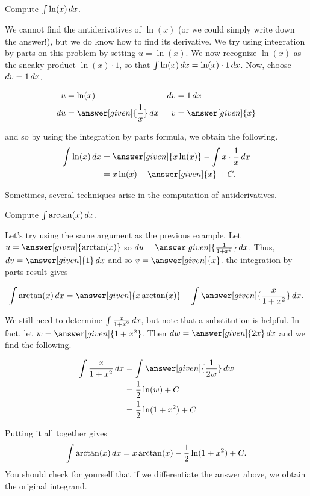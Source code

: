 \documentclass[noauthor]{ximera}
\begin{document}
\begin{example}
Compute $\int \ln(x)\mathop{}\!d x$.

\begin{explanation}
We cannot find the antiderivatives of $\ln(x)$ (or we could simply write down the answer!), but we do know how to find its derivative.  We try using integration by parts on this problem by setting $u=\ln(x)$.  We now recognize $\ln(x)$ as the sneaky product $\ln(x) \cdot 1$, so that $\int \ln(x) \mathop{}\!d x = \ln(x) \cdot 1 \mathop{}\!d x$.  Now, choose $\mathop{}\!d v = 1 \mathop{}\!d x$.  

\begin{align*}
u &= \ln(x) & \d v & =1 \d x \\
 \d u &= \answer[given]{\frac{1}{x}} \d x & v&= \answer[given]{x}
\end{align*}

and so by using the integration by parts formula, we obtain the following.
\begin{align*}
 \int \ln(x)\d x&=\answer[given]{x \ln(x)}-\int x \cdot \frac{1}{x}\d x\\
&= x\ln (x)- \answer[given]{x}+C.\\
\end{align*}
\end{explanation}
\end{example}

Sometimes, several techniques arise in the computation of antiderivatives.

\begin{example}
Compute $\int \arctan(x) \mathop{}\!d x$.

\begin{explanation}
Let's try using the same argument as the previous example.  Let $u=\answer[given]{\arctan (x)}$ so $\d u=\answer[given]{\frac{1}{1+x^{2}} } \d x$. Thus, $\d v=\answer[given]{1} \d x$ and so $v=\answer[given]{x}$.  the integration by parts result gives 


\[
\int \arctan(x) \d x= \answer[given]{x\arctan(x)}- \int \answer[given]{\frac{x}{1+x^2}} \d x.
\]

We still need to determine $\int \frac{x}{1+x^{2}} \mathop{}\!d x$, but note that a substitution is helpful.  In fact, let $w=\answer[given]{1+x^2}$. Then $\d w=\answer[given]{2 x} \d x$ and we find the following.

\begin{align*}
\int \frac{x}{1+x^{2}} \d x &= \int \answer[given]{\frac{1}{2 w}} \d w \\
&= \frac{1}{2} \ln(w) + C\\
&=\frac{1}{2} \ln(1+x^{2})+C 
\end{align*}

Putting it all together gives
\[ 
\int \arctan(x) \mathop{}\!d x = x \arctan(x) -\frac{1}{2} \ln(1+x^{2}) +C.
\]
You should check for yourself that if we differentiate the answer above, we obtain the original integrand.

\end{explanation}

\end{example}
\end{document}

